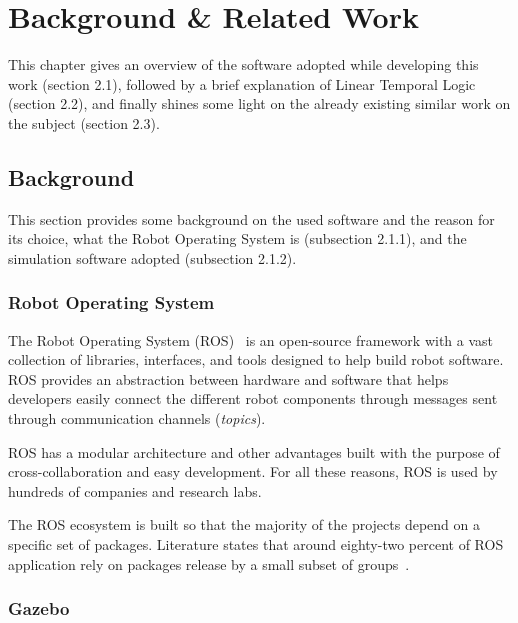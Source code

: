 \chapter{Background \& Related Work}
\label{chap:background}

This chapter gives an overview of the software adopted while developing this work (section 2.1), followed by a brief explanation of Linear Temporal Logic (section 2.2), and finally shines some light on the already existing similar work on the subject (section 2.3).

\section{Background}

This section provides some background on the used software and the reason for its choice, what the Robot Operating System is (subsection 2.1.1), and the simulation software adopted (subsection 2.1.2).

\subsection{Robot Operating System}
\label{sec:ros}

The Robot Operating System (ROS)~\cite{quigley2009ros} is an open-source framework with a vast collection of libraries, interfaces, and tools designed to help build robot software. ROS provides an abstraction between hardware and software that helps developers easily connect the different robot components through messages sent through communication channels (\textit{topics}).

ROS has a modular architecture and other advantages built with the purpose of cross-collaboration and easy development. For all these reasons, ROS is used by hundreds of companies and research labs.

The ROS ecosystem is built so that the majority of the projects depend on a specific set of packages. Literature states that around eighty-two percent of ROS application rely on packages release by a small subset of groups~\cite{9240632}.

\subsection{Gazebo}
\label{sec:gazebo}

